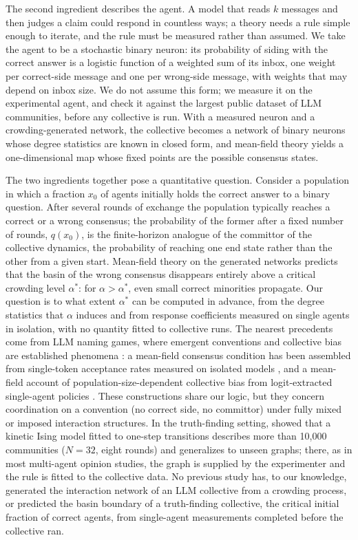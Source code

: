 \documentclass[11pt]{article}
\newcommand{\astar}{\alpha^{*}}
\begin{document}
The second ingredient describes the agent. A model that reads $k$ messages
and then judges a claim could respond in countless ways; a theory needs a
rule simple enough to iterate, and the rule must be measured rather than
assumed. We take the agent to be a stochastic binary neuron: its probability
of siding with the correct answer is a logistic function of a weighted sum
of its inbox, one weight per correct-side message and one per wrong-side
message, with weights that may depend on inbox size. We do not assume this
form; we measure it on the experimental agent, and check it against the
largest public dataset of LLM communities, before any collective is run.
With a measured neuron and a
crowding-generated network, the collective becomes a network of binary
neurons whose degree statistics are known in closed form, and mean-field
theory yields a one-dimensional map whose fixed points are the possible
consensus states.

The two ingredients together pose a quantitative question. Consider a
population in which a fraction $x_0$ of agents initially holds the correct
answer to a binary question. After several rounds of exchange the population
typically reaches a correct or a wrong consensus; the probability of the
former after a fixed number of rounds, $q(x_0)$, is the finite-horizon
analogue of the committor of the collective dynamics, the probability of
reaching one end state rather than the other from a given start. Mean-field
theory on the generated networks predicts that the basin of the wrong
consensus disappears entirely above a critical crowding level $\astar$: for
$\alpha > \astar$, even small correct minorities propagate. Our question is
to what extent $\astar$ can be computed in advance, from the degree
statistics that $\alpha$ induces and from response coefficients measured on
single agents in isolation, with no quantity fitted to collective runs. The
nearest precedents come from LLM naming games, where emergent conventions
and collective bias are established phenomena \citep{Ashery2025, Flint2026}:
a mean-field consensus condition has been assembled from single-token
acceptance rates measured on isolated models \citep{DeNobili2026}, and a
mean-field account of population-size-dependent collective bias from
logit-extracted single-agent policies \citep{Flint2026}. These constructions
share our logic, but they concern coordination on a convention (no correct
side, no committor) under fully mixed or imposed interaction structures. In
the truth-finding setting, \citet{El2026} showed that a kinetic Ising model
fitted to one-step transitions describes more than 10{,}000 communities
($N = 32$, eight rounds) and generalizes to unseen graphs; there, as in most
multi-agent opinion studies, the graph is supplied by the experimenter and
the rule is fitted to the collective data. No previous study has, to our
knowledge, generated the interaction network of an LLM collective from a
crowding process, or predicted the basin boundary of a truth-finding
collective, the critical initial fraction of correct agents, from
single-agent measurements completed before the collective ran.
\end{document}
